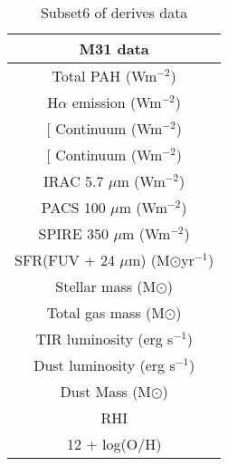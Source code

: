 \begin{table}
\centering
\caption{Subset6 of derives data}
\label{tab: subset6}
\begin{tabular}{ |c| }
\hline
M31 data  \\
\hline\hline
Total PAH (Wm$^{-2}$)  \\
H$\alpha$ emission (Wm$^{-2}$) \\
{[}\sii{]} Continuum (Wm$^{-2}$)  \\
{[}\oiii{]} Continuum (Wm$^{-2}$)  \\
IRAC 5.7 $\mu$m (Wm$^{-2}$)\\
PACS 100 $\mu$m (Wm$^{-2}$)\\
SPIRE 350 $\mu$m (Wm$^{-2}$)\\
SFR(FUV + 24 $\mu$m) (M$\odot$yr$^{-1}$) \\
Stellar mass (M$\odot$)\\
Total gas mass (M$\odot$)  \\
TIR luminosity (erg s$^{-1}$)  \\
Dust luminosity (erg s$^{-1}$)  \\
Dust Mass (M$\odot$)\\
RHI \\
12 + log(O/H)\\
\hline
\end{tabular}
\end{table}